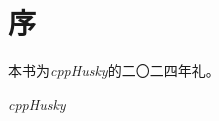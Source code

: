 \chapter{序}
本书为\textit{cppHusky}的二〇二四年礼。\par
\begin{flushright}
\textit{cppHusky}\par
\end{flushright}